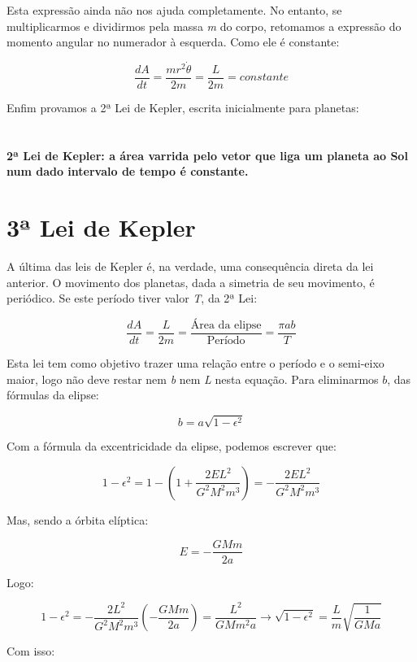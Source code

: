 Esta expressão ainda não nos ajuda completamente. No entanto, se multiplicarmos e dividirmos pela massa \textit{m} do corpo, retomamos a expressão do momento angular no numerador à esquerda. Como ele é constante:

\begin{equation}
	\frac{dA}{dt} = \frac{mr^2\dot{\theta}}{2m} = \frac{L}{2m} = constante \label{eq58}
\end{equation}

Enfim provamos a 2ª Lei de Kepler, escrita inicialmente para planetas:{\\}{\\}{\\}
\textbf{\Large{2ª Lei de Kepler: a área varrida pelo vetor que liga um planeta ao Sol num dado intervalo de tempo é constante.}}

\section{3ª Lei de Kepler}

A última das leis de Kepler é, na verdade, uma consequência direta da lei anterior. O movimento dos planetas, dada a simetria de seu movimento, é periódico. Se este período tiver valor \textit{T}, da 2ª Lei:

\begin{equation}
	\frac{dA}{dt} = \frac{L}{2m} = \frac{\text{Área da elipse}}{\text{Período}} = \frac{\pi ab}{T} \label{eq59}
\end{equation}

Esta lei tem como objetivo trazer uma relação entre o período e o semi-eixo maior, logo não deve restar nem \textit{b} nem \textit{L} nesta equação. Para eliminarmos $b$, das fórmulas da elipse:

\[
	b = a\sqrt{1 - \epsilon^2}
\]

Com a fórmula da excentricidade da elipse, podemos escrever que:

\[
	1 - \epsilon^2 = 1 - \left(1 + \frac{2EL^2}{G^2M^2m^3}\right) = - \frac{2EL^2}{G^2M^2m^3}
\]

Mas, sendo a órbita elíptica:

\[
	E = -\frac{GMm}{2a}
\]

Logo:

\[
	1 - \epsilon^2 = -\frac{2L^2}{G^2M^2m^3}\left(-\frac{GMm}{2a}\right) = \frac{L^2}{GMm^2a} \rightarrow \sqrt{1-\epsilon^2} = \frac{L}{m}\sqrt{\frac{1}{GMa}}
\]

Com isso:

